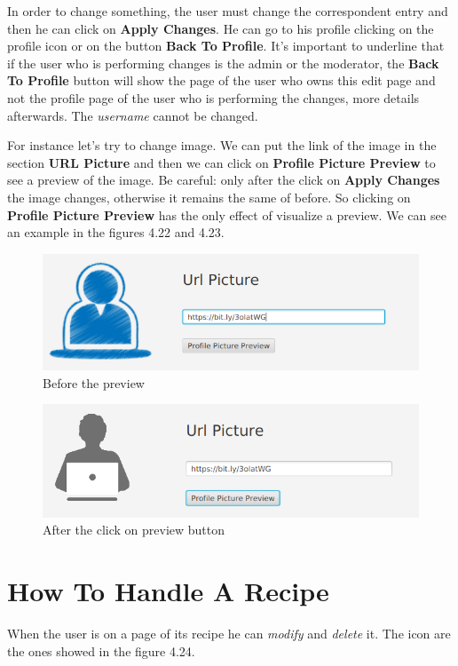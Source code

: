 \documentclass[a4paper]{report}
\begin{document}
\noindent In order to change something, the user must change the correspondent entry and then he can click on \textbf{Apply Changes}. He can go to his profile clicking on the profile icon or on the button \textbf{Back To Profile}. It's important to underline that if the user who is performing changes is the admin or the moderator, the \textbf{Back To Profile} button will show the page of the user who owns this edit page and not the profile page of the user who is performing the changes, more details afterwards. The \emph{username} cannot be changed.

\noindent For instance let's try to change image. We can put the link of the image in the section \textbf{URL Picture} and then we can click on \textbf{Profile Picture Preview} to see a preview of the image. Be careful: only after the click on \textbf{Apply Changes} the image changes, otherwise it remains the same of before. So clicking on \textbf{Profile Picture Preview} has the only effect of visualize a preview. We can see an example in the figures 4.22 and 4.23.

\begin{figure}[htpb]
	\centering
	\includegraphics[scale=0.3]{img/user_manual/beforepreview.png}
	\caption{Before the preview}
\end{figure}

\begin{figure}[htpb]
	\centering
	\includegraphics[scale=0.3]{img/user_manual/afterpreview.png}
	\caption{After the click on preview button}
\end{figure}

\section{How To Handle A Recipe}
When the user is on a page of its recipe he can \emph{modify} and \emph{delete} it. The icon are the ones showed in the figure 4.24.
\end{document}
